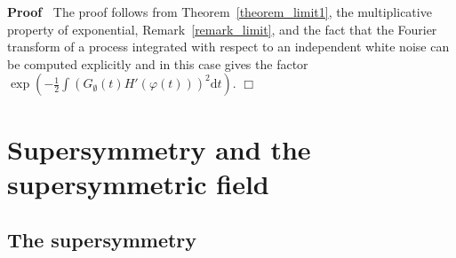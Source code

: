 \documentclass[a4paper,10pt]{article}
\newcommand{\mathd}{\mathrm{d}}
\newenvironment{proof}{\noindent\textbf{Proof\ }}{\hspace*{\fill}$\Box$\medskip}
\begin{document}
\begin{proof}
  The proof follows from Theorem~\ref{theorem_limit1}, the multiplicative
  property of exponential, Remark~\ref{remark_limit}, and the fact that the
  Fourier transform of a process integrated with respect to an independent
  white noise can be computed explicitly and in this case gives the factor
  $\exp (- \frac{1}{2} \int (G_{\emptyset} (t) H' (\varphi (t)))^2 \mathd t)$.
\end{proof}

\section{Supersymmetry and the supersymmetric field}

\subsection{The supersymmetry}
\end{document}
